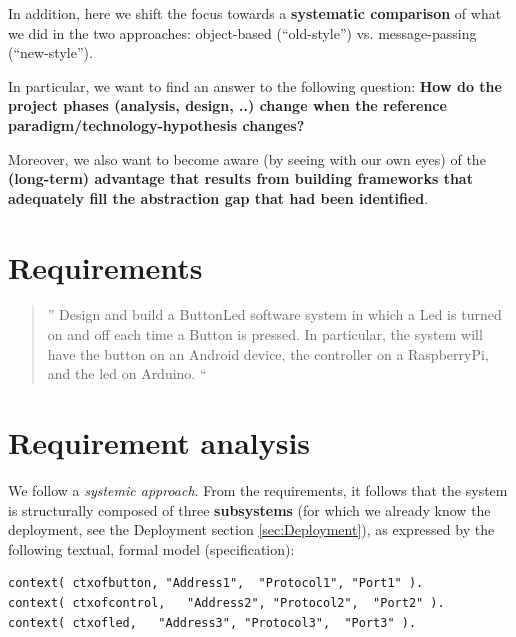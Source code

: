 \documentclass{article}
\newcommand{\labelsec}[1]{\label{sec:#1}}
\newcommand{\mycolor}{myrgb}
\newcommand{\colorize}[1]{{\color{\mycolor}#1}}
\begin{document}
\colorize{In addition, here we shift the focus towards
a \textbf{systematic comparison} of what we did in the two approaches:
object-based (``old-style'') vs. message-passing (``new-style'').

In particular, we want to find an answer to the following question:
\textbf{How do the project phases (analysis, design, ..) change when the
reference paradigm/technology-hypothesis changes?}

Moreover, we also want to become aware (by seeing with our own eyes) of the
\textbf{(long-term) advantage that results from building frameworks that
adequately fill the abstraction gap that had been identified}.

}


\section{Requirements}
\labelsec{Requirements}

\begin{quote}''
Design and build a ButtonLed software system in which a Led is turned on and off
each time a Button is pressed.
In particular, the system will have the button on an Android device, 
 the controller on a RaspberryPi, and the led on Arduino.
``\end{quote}

 
\section{Requirement analysis}
\labelsec{ReqAnalysis}

We follow a \emph{systemic approach}. From the requirements, it follows that the
system is structurally composed of three \textbf{subsystems} (for which we already know the deployment,
see the Deployment section \ref{sec:Deployment}), \colorize{as expressed by the
following textual, formal model (specification):}
 
    
\begin{lstlisting}
context( ctxofbutton, "Address1",  "Protocol1", "Port1" ).
context( ctxofcontrol,   "Address2", "Protocol2",  "Port2" ).     
context( ctxofled,   "Address3", "Protocol3",  "Port3" ).      
\end{lstlisting}
\end{document}
